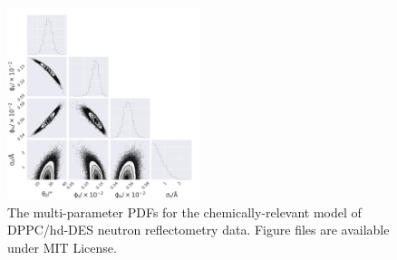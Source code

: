 \documentclass[11pt,a4paper]{article}
\begin{document}
\begin{figure}
	\centering
	\includegraphics[width=0.50\textwidth]{figures/dppc3_neutron_corner2}
	\caption{The multi-parameter PDFs for the chemically-relevant model of DPPC/hd-DES neutron reflectometry data. Figure files are available under MIT License.\cite{mccluskey_2018}}
	\label{fig:dppc3_2}
\end{figure}
	
\end{document}
